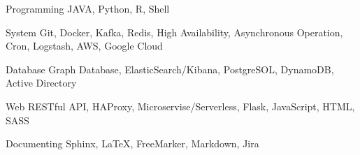

\begin{cvskills}
	
	\cvskill
	{Programming} %
	{JAVA, Python, R, Shell} %

	\cvskill
	{System} %
	{Git, Docker, Kafka, Redis, High Availability, Asynchronous Operation, Cron, Logstash, AWS, Google Cloud} %

\cvskill
	{Database} %
	{Graph Database, ElasticSearch/Kibana, PostgreSOL, DynamoDB, Active Directory} %

\cvskill
	{Web} %
	{RESTful API, HAProxy, Microservise/Serverless, Flask, JavaScript, HTML, SASS} %
	
	
	\cvskill
	{Documenting} %
	{Sphinx, LaTeX, FreeMarker, Markdown, Jira} %

%
%
%

\end{cvskills}
